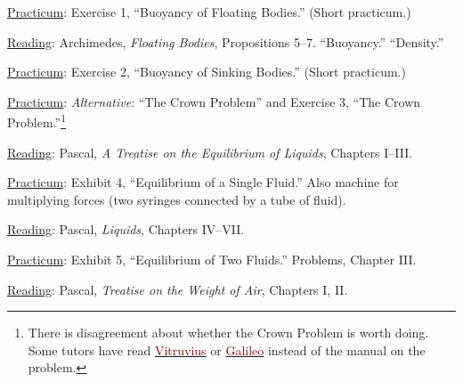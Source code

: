 \documentclass{article}
\newcommand{\rd}{\uline{Reading}}
\newcommand{\pc}{\uline{Practicum}}
\begin{document}
\begin{enumerate}
	\pc: Exercise 1, ``Buoyancy of Floating Bodies.'' (Short practicum.)

\item \rd:  Archimedes, \emph{Floating Bodies}, Propositions 5--7. ``Buoyancy.'' ``Density.'' 

	\pc: Exercise 2, ``Buoyancy of Sinking Bodies.'' (Short practicum.)

	\pc: \emph{Alternative}: ``The Crown Problem'' and Exercise 3, ``The Crown Problem.''\footnote{There is disagreement about whether the Crown Problem is worth doing. Some tutors have read \href{https://sjca.sharepoint.com/:b:/r/sites/Departments/Faculty/Documents/Annapolis/Freshman\%20Lab/Schedule\%20and\%20files/The\%20Golden\%20Crown\%20as\%20described\%20in\%20The\%20Ten\%20Books\%20on\%20Architecture\%20by\%20Marcus\%20Vitruvius\%20Pollio.pdf?csf=1&web=1&e=6rXZMT}{\textcolor{Maroon}{Vitruvius}} or \href{https://sjca.sharepoint.com/:b:/r/sites/Departments/Faculty/Documents/Annapolis/Freshman\%20Lab/Schedule\%20and\%20files/08.5\%20Galileo\%20Little\%20Balance\%202025-01-11\%2016_59_26.pdf?csf=1&web=1&e=N4DMaE}{\textcolor{Maroon}{Galileo}} instead of the manual on the problem.}


\item \rd:  Pascal, \emph{A Treatise on the Equilibrium of Liquids}, Chapters I--III. 

	\pc: Exhibit 4, ``Equilibrium of a Single Fluid.'' Also machine for multiplying forces (two syringes connected by a tube of fluid). 

\item \rd:  Pascal, \emph{Liquids}, Chapters IV--VII. 

	\pc: Exhibit 5, ``Equilibrium of Two Fluids.'' Problems, Chapter III.

\begin{minipage}{0.9\textwidth}
\item \rd:  Pascal, \emph{Treatise on the Weight of Air}, Chapters I, II. 


\end{minipage}
\end{enumerate}
\end{document}
